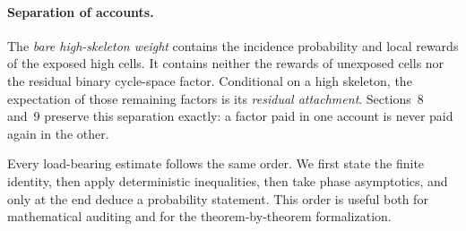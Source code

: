 \paragraph{Separation of accounts.}
The \emph{bare high-skeleton weight} contains the incidence probability and
local rewards of the exposed high cells. It contains neither the rewards of
unexposed cells nor the residual binary cycle-space factor. Conditional on a
high skeleton, the expectation of those remaining factors is its
\emph{residual attachment}. Sections~8 and~9 preserve this separation exactly:
a factor paid in one account is never paid again in the other.

Every load-bearing estimate follows the same order. We first state the finite
identity, then apply deterministic inequalities, then take phase asymptotics,
and only at the end deduce a probability statement. This order is useful both
for mathematical auditing and for the theorem-by-theorem formalization.
